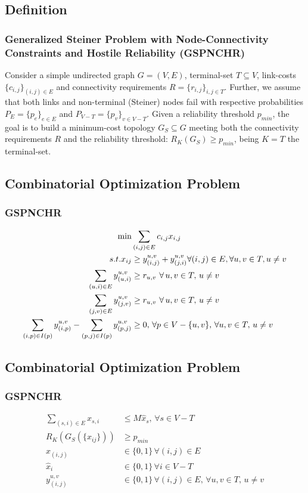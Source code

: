 \subsection{Definition}
\begin{frame}\frametitle{Generalized Steiner Problem with Node-Connectivity Constraints and
Hostile Reliability (GSPNCHR)}
    \begin{definition}[GSPNCHR]
Consider a simple undirected graph $G=(V,E)$, terminal-set $T \subseteq V$, link-costs $\{c_{i,j}\}_{(i,j) \in E}$ and connectivity requirements $R=\{r_{i,j}\}_{i,j \in T}$. Further, we assume that both links and non-terminal (Steiner) nodes fail with respective probabilities $P_E=\{p_e\}_{e\in E}$ and $P_{V-T}=\{p_v\}_{v\in V-T}$. Given a reliability threshold $p_{min}$, the goal is to build a minimum-cost topology $G_S \subseteq G$ meeting both the connectivity requirements $R$ and the reliability threshold: $R_{K}(G_S) \geq p_{min}$, being $K=T$ the terminal-set.
\end{definition}
\end{frame}

\subsection{Combinatorial Optimization Problem}
\begin{frame}\frametitle{GSPNCHR}
\begin{align}
\min &\sum_{(i,j)\in E} c_{i,j}x_{i,j} \notag \\
s.t. x_{ij}&\geq y_{(i,j)}^{u,v}+y_{(j,i)}^{u,v} \forall (i,j)\in E,
\forall u,v\in T, u \neq v \\
\sum_{(u,i)\in E}y_{(u,i)}^{u,v} &\geq r_{u,v} \, \, \forall \, u,v\in T, \, u\neq v \\
\sum_{(j,v)\in E}y_{(j,v)}^{u,v} &\geq r_{u,v} \, \, \forall \, u,v\in T, \, u\neq v \\
\sum_{(i,p)\in I(p)}y_{(i,p)}^{u,v}  - \sum_{(p,j)\in I(p)}y_{(p,j)}^{u,v}&\geq 0, \, \forall p\in V-\{u,v\}, \, \forall u,v\in T, \, u \neq v \notag \\
\end{align}
\end{frame}

\subsection{Combinatorial Optimization Problem}
\begin{frame}\frametitle{GSPNCHR}
\begin{align}
\sum_{(s,i)\in E} x_{s,i} &\leq M \hat{x}_{s}, \, \forall s\in V-T \\
R_{K}(G_S(\{x_{ij}\})) &\geq p_{min} \\
x_{(i,j)} &\in \{0,1\} \, \forall (i,j)\in E \\
\hat{x}_{i} &\in \{0,1\} \, \forall i \in V-T  \\
 y_{(i,j)}^{u,v} &\in \{0,1\} \, \forall (i,j)\in E, \, \forall u,v \in T, \, u \neq v
\end{align}
\end{frame}

